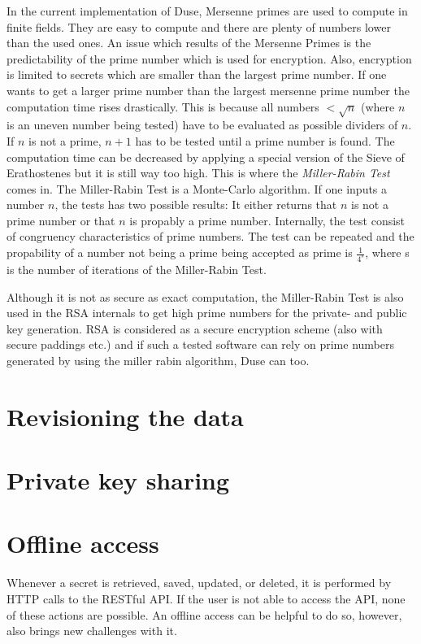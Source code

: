 In the current implementation of Duse, Mersenne primes are used to
compute in finite fields. They are easy to compute and there are
plenty of numbers lower than the used ones. An issue which results
of the Mersenne Primes is the predictability of the prime number
which is used for encryption. Also, encryption is limited to secrets
which are smaller than the largest prime number. If one wants to
get a larger prime number than the largest mersenne prime number the
computation time rises drastically. This is because all numbers
$< \sqrt{n}$ (where $n$ is an uneven number being tested) have to be evaluated
as possible dividers of $n$. If $n$ is not a prime, $n+1$ has to be
tested until a prime number is found. The computation time can be
decreased by applying a special version of the Sieve of Erathostenes but
it is still way too high. This is where the \textit{Miller-Rabin Test}
comes in. The Miller-Rabin Test is a Monte-Carlo algorithm. If one inputs
a number $n$, the tests has two possible results: It either returns
that $n$ is not a prime number or that $n$ is propably a prime number.
Internally, the test consist of congruency characteristics of prime numbers.
The test can be repeated and the propability of a number not being a
prime being accepted as prime is $\frac{1}{4^s}$, where s is the number
of iterations of the Miller-Rabin Test.

Although it is not as secure as exact computation, the Miller-Rabin Test
is also used in the RSA internals to get high prime numbers for the
private- and public key generation. RSA is considered as a secure
encryption scheme (also with secure paddings etc.) and if such a tested
software can rely on prime numbers generated by using the miller rabin
algorithm, Duse can too.

\section{Revisioning the data}
\section{Private key sharing}
\section{Offline access}

Whenever a secret is retrieved, saved, updated, or deleted, it is performed by
HTTP calls to the RESTful API. If the user is not able to access the API, none
of these actions are possible. An offline access can be helpful to do so, however,
also brings new challenges with it.

